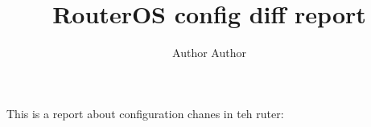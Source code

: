 \documentclass{article}
\title{RouterOS config diff report}
\author{Author Author}
\begin{document}
\maketitle

This is a report about configuration chanes in teh ruter:


\end{document}
